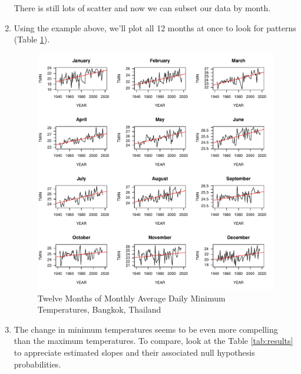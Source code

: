 \documentclass{article}\usepackage[]{graphicx}\usepackage[]{color}
\makeatletter
\def\maxwidth{ %
  \ifdim\Gin@nat@width>\linewidth
    \linewidth
  \else
    \Gin@nat@width
  \fi
}
\newenvironment{knitrout}{}{} %
\makeatother
\begin{document}
\begin{enumerate}
\begin{knitrout}
\end{knitrout}

There is still lots of scatter and now we can subset our data by month. 

\item Using the example above, we'll plot all 12 months at once to look for patterns (Table \ref{fig:TMIN}).

\begin{figure}[ht]
\caption{Twelve Months of Monthly Average Daily Minimum 
Temperatures, Bangkok, Thailand}
\label{fig:TMIN}
\begin{knitrout}
\color{fgcolor}
\includegraphics[width=\maxwidth]{figure/12MonthsTMIN-1} 

\end{knitrout}
\end{figure} 

\item The change in minimum temperatures seems to be even more compelling than the maximum temperatures. To compare, look at the Table \ref{tab:results} to appreciate estimated slopes and their associated null hypothesis probabilities. 


\end{enumerate}
\end{document}
